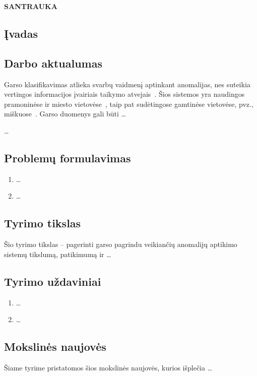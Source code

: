 \noindent\begin{minipage}{\textwidth}
	\textbf{\MakeUppercase{Santrauka}}
    \setcounter{section}{0}
	\subsection*{\k{I}vadas}\label{chap:introlt}
\end{minipage}
\subsection*{Darbo aktualumas}
Garso klasifikavimas atlieka svarbų vaidmenį aptinkant anomalijas, nes suteikia vertingos informacijos įvairiais taikymo atvejais~\cite{Kilickaya2025, LoScudo2023, Barusco2025}. Šios sistemos yra naudingos pramoninėse ir miesto vietovėse~\cite{Purohit2019, Piczak2015, Salamon2014}, taip pat sudėtingose gamtinėse vietovėse, pvz., miškuose~\cite{Bandara2023}. Garso duomenys gali būti \dots

\dots
\subsection*{Problemų formulavimas}
\begin{enumerate}[leftmargin=*]
	\item \dots
	\item \dots
\end{enumerate}
\subsection*{Tyrimo tikslas}
Šio tyrimo tikslas – pagerinti garso pagrindu veikiančių anomalijų aptikimo sistemų tikslumą, patikimumą ir \dots

\subsection*{Tyrimo uždaviniai}
\begin{enumerate}[leftmargin=*]
	\item \dots
	\item \dots
\end{enumerate}

\subsection*{Mokslinės naujovės}
Šiame tyrime pristatomos šios mokslinės naujovės, kurios išplečia \dots

